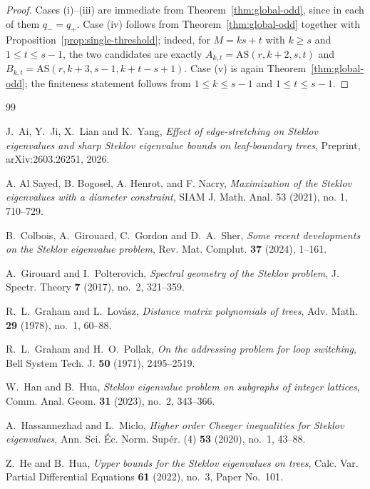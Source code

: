 \documentclass[11pt]{article}
\theoremstyle{remark}
\newcommand{\AS}{\mathrm{AS}}
\begin{document}
\begin{proof}
Cases \textnormal{(i)}--\textnormal{(iii)} are immediate from Theorem~\ref{thm:global-odd}, since in each of them $q_-=q_+$.
Case \textnormal{(iv)} follows from Theorem~\ref{thm:global-odd} together with Proposition~\ref{prop:single-threshold}; indeed, for $M=ks+t$ with $k\ge s$ and $1\le t\le s-1$, the two candidates are exactly $A_{k,t}=\AS(r,k+2,s,t)$ and $B_{k,t}=\AS(r,k+3,s-1,k+t-s+1)$.
Case \textnormal{(v)} is again Theorem~\ref{thm:global-odd}; the finiteness statement follows from $1\le k\le s-1$ and $1\le t\le s-1$.
\end{proof}
\begin{thebibliography}{99}

J.~Ai, Y.~Ji, X.~Lian and K.~Yang,
\emph{Effect of edge-stretching on Steklov eigenvalues and sharp Steklov eigenvalue bounds on leaf-boundary trees},
Preprint, arXiv:2603.26251, 2026.

A. Al Sayed, B. Bogosel, A. Henrot, and F. Nacry,
\emph{Maximization of the Steklov eigenvalues with a diameter constraint},
SIAM J. Math. Anal. 53 (2021), no. 1, 710--729.

B.~Colbois, A.~Girouard, C.~Gordon and D.~A.~Sher,
\emph{Some recent developments on the Steklov eigenvalue problem},
Rev. Mat. Complut. \textbf{37} (2024), 1--161.

A.~Girouard and I.~Polterovich,
\emph{Spectral geometry of the Steklov problem},
J. Spectr. Theory \textbf{7} (2017), no.~2, 321--359.

R.~L.~Graham and L.~Lov\'asz,
\emph{Distance matrix polynomials of trees},
Adv. Math. \textbf{29} (1978), no.~1, 60--88.

R.~L.~Graham and H.~O.~Pollak,
\emph{On the addressing problem for loop switching},
Bell System Tech. J. \textbf{50} (1971), 2495--2519.

W.~Han and B.~Hua,
\emph{Steklov eigenvalue problem on subgraphs of integer lattices},
Comm. Anal. Geom. \textbf{31} (2023), no.~2, 343--366.

A.~Hassannezhad and L.~Miclo,
\emph{Higher order Cheeger inequalities for Steklov eigenvalues},
Ann. Sci. \'Ec. Norm. Sup\'er. (4) \textbf{53} (2020), no.~1, 43--88.

Z.~He and B.~Hua,
\emph{Upper bounds for the Steklov eigenvalues on trees},
Calc. Var. Partial Differential Equations \textbf{61} (2022), no.~3, Paper No.~101.


\end{thebibliography}
\end{document}
